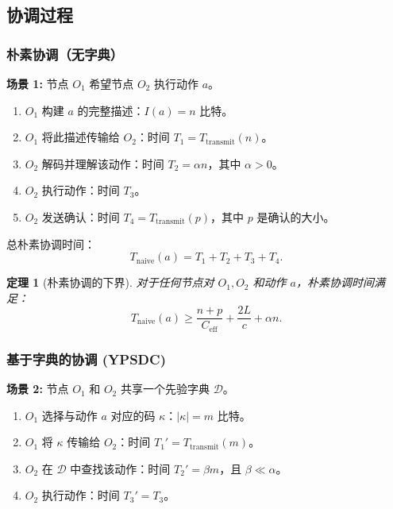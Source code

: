 \documentclass[12pt]{article}
\newtheorem{theorem}{定理}
\begin{document}
	\subsection{协调过程}
	\label{app:coordination-processes}
	
	\subsubsection{朴素协调（无字典）}
	
	\textbf{场景 1:} 节点 $O_1$ 希望节点 $O_2$ 执行动作 $a$。
	
	\begin{enumerate}
		\item $O_1$ 构建 $a$ 的完整描述：$I(a) = n$ 比特。
		\item $O_1$ 将此描述传输给 $O_2$：时间 $T_1 = T_{\text{transmit}}(n)$。
		\item $O_2$ 解码并理解该动作：时间 $T_2 = \alpha n$，其中 $\alpha > 0$。
		\item $O_2$ 执行动作：时间 $T_3$。
		\item $O_2$ 发送确认：时间 $T_4 = T_{\text{transmit}}(p)$，其中 $p$ 是确认的大小。
	\end{enumerate}
	
	总朴素协调时间：
	\[
	T_{\text{naive}}(a) = T_1 + T_2 + T_3 + T_4.
	\]
	
	\begin{theorem}[朴素协调的下界]
		\label{thm:naive-lower-bound}
		对于任何节点对 $O_1, O_2$ 和动作 $a$，朴素协调时间满足：
		\[
		T_{\text{naive}}(a) \geq \frac{n + p}{C_{\text{eff}}} + \frac{2L}{c} + \alpha n.
		\]
	\end{theorem}
	
	\subsubsection{基于字典的协调 (YPSDC)}
	
	\textbf{场景 2:} 节点 $O_1$ 和 $O_2$ 共享一个先验字典 $\mathcal{D}$。
	
	\begin{enumerate}
		\item $O_1$ 选择与动作 $a$ 对应的码 $\kappa$：$|\kappa| = m$ 比特。
		\item $O_1$ 将 $\kappa$ 传输给 $O_2$：时间 $T_1' = T_{\text{transmit}}(m)$。
		\item $O_2$ 在 $\mathcal{D}$ 中查找该动作：时间 $T_2' = \beta m$，且 $\beta \ll \alpha$。
		\item $O_2$ 执行动作：时间 $T_3' = T_3$。
	\end{enumerate}
	
\end{document}
